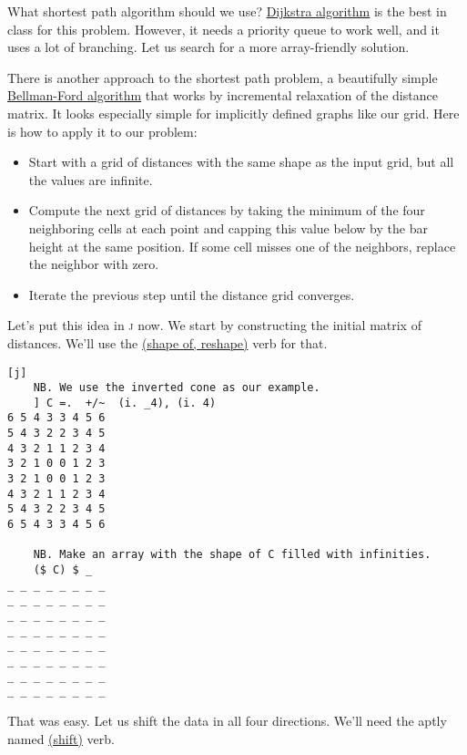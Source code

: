 \documentclass{article}
\begin{document}
What shortest path algorithm should we use?
\href{https://en.wikipedia.org/wiki/Dijkstra%27s_algorithm}{Dijkstra algorithm} is the best in class for this problem.
However, it needs a priority queue to work well, and it uses a lot of branching.
Let us search for a more array-friendly solution.

There is another approach to the shortest path problem, a beautifully simple \href{https://en.wikipedia.org/wiki/Bellman%E2%80%93Ford_algorithm}{Bellman-Ford algorithm} that works by incremental relaxation of the distance matrix.
It looks especially simple for implicitly defined graphs like our grid.
Here is how to apply it to our problem:

\begin{itemize}
  \item
    Start with a grid of distances with the same shape as the input grid, but all the values are infinite.
  \item
    Compute the next grid of distances by taking the minimum of the four neighboring cells at each point and capping this value below by the bar height at the same position.
    If some cell misses one of the neighbors, replace the neighbor with zero.
  \item Iterate the previous step until the distance grid converges.
\end{itemize}

Let's put this idea in \textsc{j} now.
We start by constructing the initial matrix of distances.
We'll use the \href{https://code.jsoftware.com/wiki/Vocabulary/dollar}{\code{\$} (shape of, reshape)} verb for that.

\begin{verbatim}[j]
    NB. We use the inverted cone as our example.
    ] C =.  +/~  (i. _4), (i. 4)
6 5 4 3 3 4 5 6
5 4 3 2 2 3 4 5
4 3 2 1 1 2 3 4
3 2 1 0 0 1 2 3
3 2 1 0 0 1 2 3
4 3 2 1 1 2 3 4
5 4 3 2 2 3 4 5
6 5 4 3 3 4 5 6

    NB. Make an array with the shape of C filled with infinities.
    ($ C) $ _
_ _ _ _ _ _ _ _
_ _ _ _ _ _ _ _
_ _ _ _ _ _ _ _
_ _ _ _ _ _ _ _
_ _ _ _ _ _ _ _
_ _ _ _ _ _ _ _
_ _ _ _ _ _ _ _
_ _ _ _ _ _ _ _
\end{verbatim}

That was easy.
Let us shift the data in all four directions.
We'll need the aptly named \href{https://code.jsoftware.com/wiki/Vocabulary/bardot#dyadicfit}{ (shift)} verb.
\end{document}
